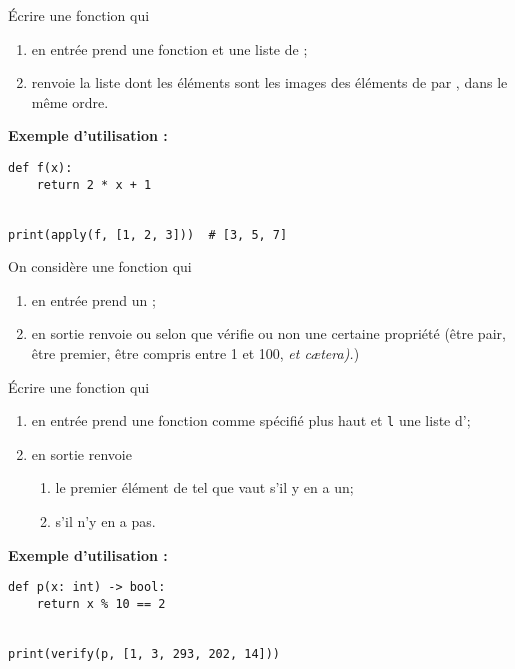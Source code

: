 \documentclass[a4paper,12pt,french]{article}
\begin{document}

\begin{exercice}
	\'Ecrire une fonction  qui
\begin{enumerate}[--]
	\item 	en entrée prend une fonction  et  une liste de ;
	\item 	renvoie la liste dont les éléments sont les images des éléments de  par , dans le même ordre.
\end{enumerate}
\textbf{Exemple d'utilisation :}
\begin{verbatim}
def f(x):
    return 2 * x + 1


print(apply(f, [1, 2, 3]))  # [3, 5, 7]
\end{verbatim}

\end{exercice}

\begin{exercice}
	On considère une fonction  qui
	\begin{enumerate}[--]
		\item 	en entrée prend un ;
		\item 	en sortie renvoie  ou  selon que  vérifie ou non une certaine propriété (être pair, être premier, être compris entre 1 et 100, \textit{et c\ae tera).})
	\end{enumerate}
	\'Ecrire une fonction  qui
\begin{enumerate}[--]
	\item 	en entrée prend  une fonction comme spécifié plus haut et \texttt{l} une liste d';
	\item 	en sortie renvoie
		\begin{enumerate}[--]
			\item 	le premier élément  de  tel que  vaut  s'il y en a un;
			\item 	{} s'il n'y en a pas.	
		\end{enumerate} 
\end{enumerate}
\textbf{Exemple d'utilisation :}
\begin{verbatim}
def p(x: int) -> bool:
    return x % 10 == 2


print(verify(p, [1, 3, 293, 202, 14]))
\end{verbatim}
\end{exercice}
\end{document}
